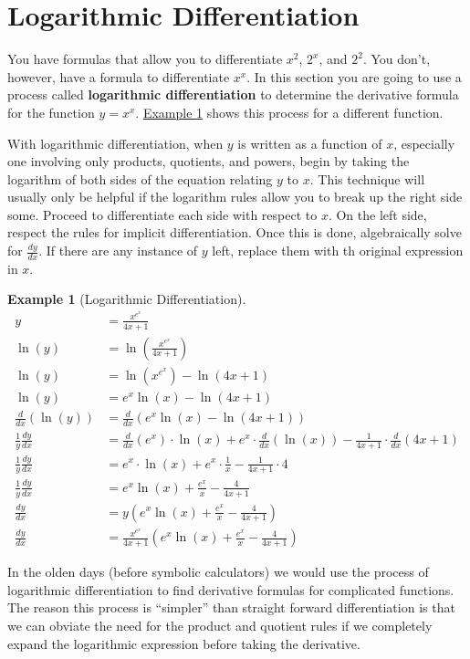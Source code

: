 \documentclass[12pt,]{book}
\newcommand{\terminology}[1]{\textbf{#1}}
\theoremstyle{plain}
\theoremstyle{definition}
\newtheorem{example}[theorem]{Example}
\numberwithin{equation}{section}
\newcommand{\fe}[2]{#1\mathopen{}\left(#2\right)\mathclose{}}
\newcommand{\lz}[2]{\frac{d#1}{d#2}}
\newcommand{\lzoo}[2]{{\frac{d}{d#1}}{\left(#2\right)}}
\begin{document}
\section[Logarithmic Differentiation]{Logarithmic Differentiation}\label{section-logarithmic-differentiation}
You have formulas that allow you to differentiate \(x^2\), \(2^x\), and \(2^2\).  You don't, however, have a formula to differentiate \(x^x\).  In this section you are going to use a process called \terminology{logarithmic differentiation} to determine the derivative formula for the function \(y=x^x\).  \hyperref[example-logarithmic-differentitation]{Example \ref{example-logarithmic-differentitation}} shows this process for a different function.%
\par
With logarithmic differentiation, when \(y\) is written as a function of \(x\), especially one involving only products, quotients, and powers, begin by taking the logarithm of both sides of the equation relating \(y\) to \(x\). This technique will usually only be helpful if the logarithm rules allow you to break up the right side some. Proceed to differentiate each side with respect to \(x\). On the left side, respect the rules for implicit differentiation. Once this is done, algebraically solve for \(\lz{y}{x}\). If there are any instance of \(y\) left, replace them with th original expression in \(x\).%
\begin{example}[Logarithmic Differentiation]\label{example-logarithmic-differentitation}
\begin{align*}
y&=\frac{x^{e^x}}{4x+1}\\
\fe{\ln}{y}&=\fe{\ln}{\frac{x^{e^x}}{4x+1}}\\
\fe{\ln}{y}&=\fe{\ln}{x^{e^x}}-\fe{\ln}{4x+1}\\
\fe{\ln}{y}&=e^x\fe{\ln}{x}-\fe{\ln}{4x+1}\\
\lzoo{x}{\fe{\ln}{y}}&=\lzoo{x}{e^x\fe{\ln}{x}-\fe{\ln}{4x+1}}\\
\frac{1}{y}\lz{y}{x}&=\lzoo{x}{e^x}\cdot\fe{\ln}{x}+e^x\cdot\lzoo{x}{\fe{\ln}{x}}-\frac{1}{4x+1}\cdot\lzoo{x}{4x+1}\\
\frac{1}{y}\lz{y}{x}&=e^x\cdot\fe{\ln}{x}+e^x\cdot\frac{1}{x}-\frac{1}{4x+1}\cdot4\\
\frac{1}{y}\lz{y}{x}&=e^x\fe{\ln}{x}+\frac{e^x}{x}-\frac{4}{4x+1}\\
\lz{y}{x}&=y\left(e^x\fe{\ln}{x}+\frac{e^x}{x}-\frac{4}{4x+1}\right)\\
\lz{y}{x}&=\frac{x^{e^x}}{4x+1}\left(e^x\fe{\ln}{x}+\frac{e^x}{x}-\frac{4}{4x+1}\right)
\end{align*}%
\end{example}
\par
In the olden days (before symbolic calculators) we would use the process of logarithmic differentiation to find derivative formulas for complicated functions.  The reason this process is ``simpler'' than straight forward differentiation is that we can obviate the need for the product and quotient rules if we completely expand the logarithmic expression before taking the derivative.%
\typeout{************************************************}
\typeout{************************************************}
\end{document}
